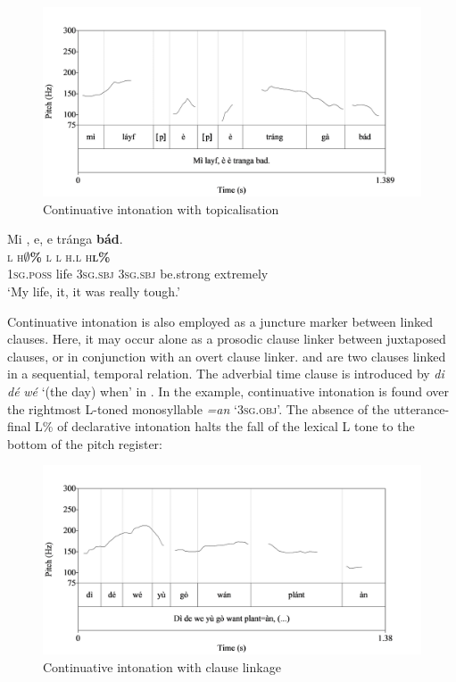 \begin{figure}
\caption{Continuative intonation with topicalisation}
\label{fig:key:3.39}
\includegraphics[height=.3\textheight]{figures/yakpomod-img41.png}
\end{figure}

  
 
\ea\label{ex:key:92}
\glll Mi ,  e,    e    tránga \textbf{bád}.\\
\textsc{l}    \textsc{h}\textbf{\textsc{${\emptyset}$}}\textbf{\textsc{\%}  }  \textsc{l}    \textsc{l}    \textsc{h.l}      \textsc{h}\textbf{\textsc{l\%}}\\
\textsc{1sg.poss}  life    \textsc{3sg.sbj}  \textsc{3sg.sbj}  be.strong  extremely\\
\glt ‘My life, it, it was really tough.’    
\z

Continuative intonation is also employed as a juncture marker between linked clauses. Here, it may occur alone as a prosodic clause linker between juxtaposed clauses, or in conjunction with an overt clause linker.  and  are two clauses linked in a sequential, temporal relation. The adverbial time clause is introduced by \textit{di} \textit{dé} \textit{wé} ‘(the day) when’ in . In the example, continuative intonation is found over the rightmost L-toned monosyllable \textit{=an} ‘\textsc{3sg.obj}’. The absence of the utterance-final L\% of declarative intonation halts the fall of the lexical L tone to the bottom of the pitch register:

\begin{figure}
\caption{Continuative intonation with clause linkage} 
\label{fig:key:3.40}
\includegraphics[height=.3\textheight]{figures/yakpomod-img42.png}
\end{figure}

